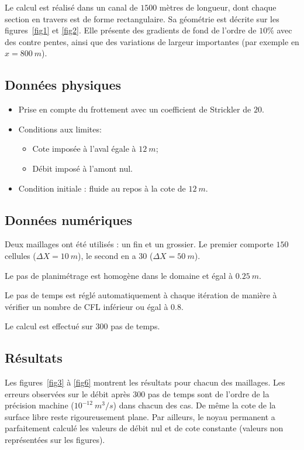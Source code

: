 \documentclass[a4paper,10pt]{article}
\begin{document}
Le calcul est réalisé dans un canal de $1500$ mètres de longueur, dont chaque section en travers est de forme rectangulaire. Sa géométrie est décrite sur les figures~\ref{fig1} et \ref{fig2}. Elle présente des gradients de fond de l’ordre de $10\%$ avec des contre pentes, ainsi que des variations de largeur importantes (par exemple en $x = 800\ m$).

\subsection*{Données physiques}

\begin{itemize} 
 \item Prise en compte du frottement avec un coefficient de Strickler de $20$.
 \item Conditions aux limites:
 \begin{itemize}
  \item Cote imposée à l’aval égale à $12\ m$;
  \item Débit imposé à l’amont nul.
 \end{itemize}
 \item Condition initiale : fluide au repos à la cote de $12\ m$. 
\end{itemize} 

\subsection*{Données numériques}

Deux maillages ont été utilisés : un fin et un grossier. Le premier comporte $150$ cellules ($\Delta X = 10\ m$), le second en a $30$ ($\Delta X = 50\ m$).

Le pas de planimétrage est homogène dans le domaine et égal à $0.25\ m$.

Le pas de temps est réglé automatiquement à chaque itération de manière à vérifier un nombre de CFL inférieur ou égal à $0.8$.

Le calcul est effectué sur $300$ pas de temps.

\subsection*{Résultats}

Les figures~\ref{fig3} à \ref{fig6} montrent les résultats pour chacun des maillages. Les erreurs observées sur le débit après $300$ pas de temps sont de l'ordre de la précision machine ($10^{-12}\ m^3/s$) dans chacun des cas. De même la cote de la surface libre reste rigoureusement plane. Par ailleurs, le noyau permanent a parfaitement calculé les valeurs de débit nul et de cote constante (valeurs non représentées sur les figures).
\end{document}
